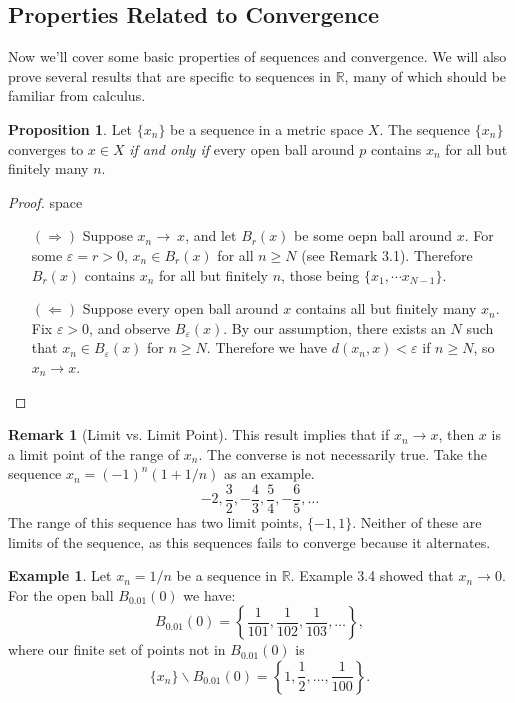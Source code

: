 \documentclass{article}
\newcommand{\R}{\mathbb{R}}
\theoremstyle{definition}
\newtheorem{proposition}{Proposition}[section]
\newtheorem{example}{Example}[section]
\newtheorem{remark}{Remark}[section]
\begin{document}
	\subsection{Properties Related to Convergence}
	Now we'll cover some basic properties of sequences and convergence. We will also prove several results that are specific to sequences in $ \R $, many of which should be familiar from calculus. 
	\begin{proposition}
		Let $ \{x_n\} $ be a sequence in a metric space $ X $. The sequence $ \{x_n\} $ converges to $ x\in X $ \textit{if and only if} every open ball around $ p $ contains $ x_n $ for all but finitely many $ n $.  
	\end{proposition}
	\begin{proof}{\color{white}space}
		\begin{enumerate}
			\item [$ (\Longrightarrow) $] Suppose $ x_n\to\ x $, and let $ B_r(x) $ be some oepn ball around $ x $. For some $ \varepsilon=r>0 $, $ x_n\in B_r(x) $ for all $ n\ge N $ (see Remark 3.1). Therefore $ B_r(x) $ contains $ x_n $ for all but finitely $ n $, those being $ \{x_1,\cdots x_{N-1}\} $.  
			\item [$ (\Longleftarrow) $] Suppose every open ball around $ x $ contains all but finitely many $ x_n $. Fix $ \varepsilon >0 $, and observe $ B_\varepsilon(x) $. By our assumption, there exists an $ N $ such that $ x_n\in B_\varepsilon(x) $ for $ n\ge N $. Therefore we have $ d(x_n,x)<\varepsilon $ if $ n\ge N $, so $ x_n\to x $.   
		\end{enumerate}
	\end{proof}
	\begin{remark}[Limit vs. Limit Point]
		This result implies that if $ x_n\to x $, then $ x $ is a limit point of the range of $ x_n $. The converse is not necessarily true. Take the sequence $ x_n=(-1)^n(1+1/n) $ as an example. $$-2, \frac{3}{2}, -\frac{4}{3},\frac{5}{4},-\frac{6}{5},\ldots $$ The range of this sequence has two limit points, $ \{-1,1\} $. Neither of these are limits of the sequence, as this sequences fails to converge because it alternates. 
	\end{remark}
	\begin{example}
		Let $ x_n=1/n $ be a sequence in $ \R $. Example 3.4 showed that $ x_n\to 0 $. For the open ball $ B_{0.01}(0) $ we have: $$ B_{0.01}(0)=\left\{\frac{1}{101},\frac{1}{102},\frac{1}{103},\ldots\right\}, $$ where our finite set of points not in $ B_{0.01}(0) $ is $$\{x_n\}\backslash B_{0.01}(0)=\left\{1,\frac{1}{2},\ldots, \frac{1}{100}\right\}.$$
	\end{example}
\end{document}
